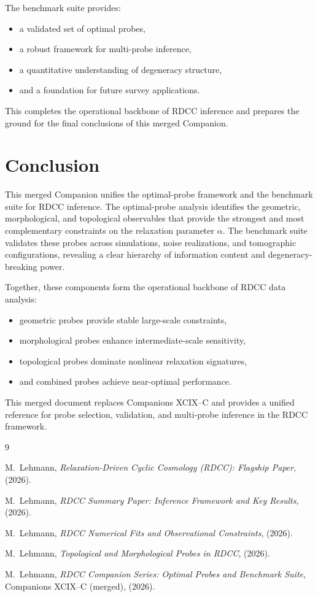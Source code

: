 \documentclass[11pt,a4paper]{article}
\begin{document}
The benchmark suite provides:
\begin{itemize}
    \item a validated set of optimal probes,
    \item a robust framework for multi-probe inference,
    \item a quantitative understanding of degeneracy structure,
    \item and a foundation for future survey applications.
\end{itemize}

This completes the operational backbone of RDCC inference and prepares the 
ground for the final conclusions of this merged Companion.
\section{Conclusion}

This merged Companion unifies the optimal-probe framework and the benchmark 
suite for RDCC inference. The optimal-probe analysis identifies the geometric, 
morphological, and topological observables that provide the strongest and most 
complementary constraints on the relaxation parameter $\alpha$. The benchmark 
suite validates these probes across simulations, noise realizations, and 
tomographic configurations, revealing a clear hierarchy of information content 
and degeneracy-breaking power.

Together, these components form the operational backbone of RDCC data analysis:
\begin{itemize}
    \item geometric probes provide stable large-scale constraints,
    \item morphological probes enhance intermediate-scale sensitivity,
    \item topological probes dominate nonlinear relaxation signatures,
    \item and combined probes achieve near-optimal performance.
\end{itemize}

This merged document replaces Companions XCIX--C and provides a unified 
reference for probe selection, validation, and multi-probe inference in the 
RDCC framework.

\begin{thebibliography}{9}

M.~Lehmann,
\textit{Relaxation-Driven Cyclic Cosmology (RDCC): Flagship Paper},
(2026).

M.~Lehmann,
\textit{RDCC Summary Paper: Inference Framework and Key Results},
(2026).

M.~Lehmann,
\textit{RDCC Numerical Fits and Observational Constraints},
(2026).

M.~Lehmann,
\textit{Topological and Morphological Probes in RDCC},
(2026).

M.~Lehmann,
\textit{RDCC Companion Series: Optimal Probes and Benchmark Suite},
Companions XCIX--C (merged), (2026).

\end{thebibliography}
\end{document}

